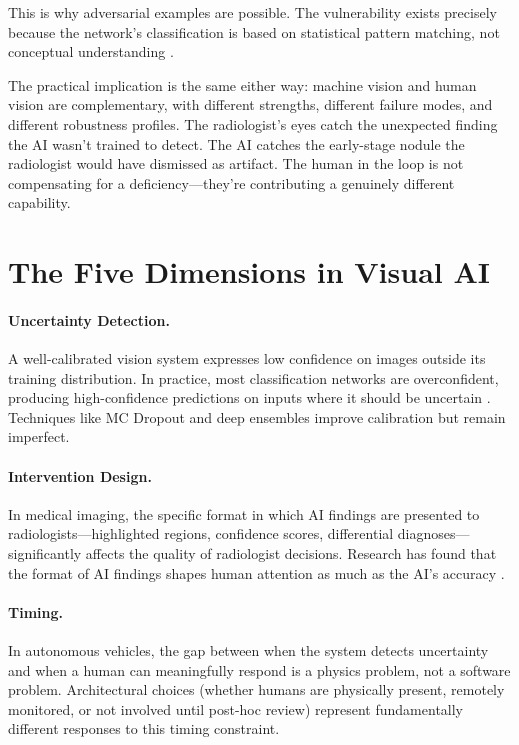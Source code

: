 This is why adversarial examples are possible. The vulnerability exists precisely because the network's classification is based on statistical pattern matching, not conceptual understanding \autocite{goodfellow2015explaining}.

The practical implication is the same either way: machine vision and human vision are complementary, with different strengths, different failure modes, and different robustness profiles. The radiologist's eyes catch the unexpected finding the AI wasn't trained to detect. The AI catches the early-stage nodule the radiologist would have dismissed as artifact. The human in the loop is not compensating for a deficiency---they're contributing a genuinely different capability.

\section{The Five Dimensions in Visual AI}
\label{sec:five-dimensions-vision}

\paragraph{Uncertainty Detection.} A well-calibrated vision system expresses low confidence on images outside its training distribution. In practice, most classification networks are overconfident, producing high-confidence predictions on inputs where it should be uncertain \autocite{guo2017calibration}. Techniques like MC Dropout \autocite{gal2016dropout} and deep ensembles \autocite{lakshminarayanan2017simple} improve calibration but remain imperfect.

\paragraph{Intervention Design.} In medical imaging, the specific format in which AI findings are presented to radiologists---highlighted regions, confidence scores, differential diagnoses---significantly affects the quality of radiologist decisions. Research has found that the format of AI findings shapes human attention as much as the AI's accuracy \autocite{gaube2021ai}.

\paragraph{Timing.} In autonomous vehicles, the gap between when the system detects uncertainty and when a human can meaningfully respond is a physics problem, not a software problem. Architectural choices (whether humans are physically present, remotely monitored, or not involved until post-hoc review) represent fundamentally different responses to this timing constraint.

